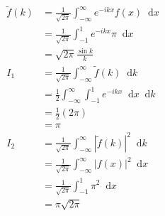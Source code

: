 \documentclass[12pt]{article}
\newcommand*\diff{\mathop{}\!\mathrm{d}}
\newenvironment{problem}[2][Problem]{\begin{trivlist}
\item[\hskip \labelsep {\bfseries #1}\hskip \labelsep {\bfseries #2.}]}{\end{trivlist}}
\begin{document}
\begin{problem}{2}
\end{problem}
\begin{align*}
	\widetilde{f}(k) &=
		\frac{1}{\sqrt{2\pi}}
		\int_{-\infty}^\infty e^{-ikx} f(x) \diff x
	\\
	&=
		\frac{1}{\sqrt{2\pi}}
		\int_{-1}^1 e^{-ikx} \pi \diff x
	\\
	&=
		\sqrt{2\pi}
			\frac{\sin k}{k}
	\\
	I_1 &= 
		\frac{1}{\sqrt{2\pi}}
		\int_{-\infty}^\infty 
			\widetilde{f}(k)
		\diff k
	\\
	&= 
		\frac{1}{2}
		\int_{-\infty}^\infty 
			\int_{-1}^1 e^{-ikx} \diff x
		\diff k
	\\
	&=
		\frac{1}{2} (2\pi)
	\\
	&= \pi \\
	I_2 &= 
		\frac{1}{\sqrt{2\pi}}
		\int_{-\infty}^\infty 
			|\widetilde{f}(k)|^2
		\diff k
	\\
	&= 
		\frac{1}{\sqrt{2\pi}}
		\int_{-\infty}^\infty 
			|f(x)|^2
		\diff x
	\\
	&= \frac{1}{\sqrt{2\pi}}
		\int_{-1}^1
			\pi^2
		\diff x
	\\
	&= \pi\sqrt{2\pi}
\end{align*}
\filbreak
\end{document}

